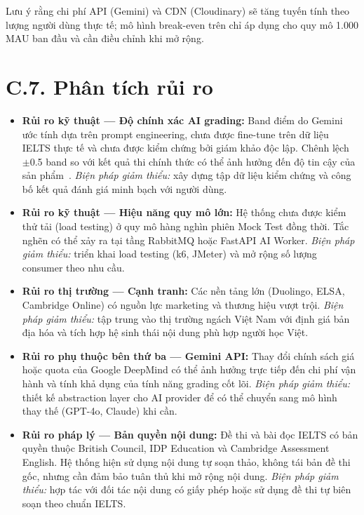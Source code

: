 Lưu ý rằng chi phí API (Gemini) và CDN (Cloudinary) sẽ tăng tuyến tính theo lượng người dùng thực tế; mô hình break-even trên chỉ áp dụng cho quy mô 1.000 MAU ban đầu và cần điều chỉnh khi mở rộng.

\section*{C.7. Phân tích rủi ro}

\begin{itemize}
    \item \textbf{Rủi ro kỹ thuật --- Độ chính xác AI grading:} Band điểm do Gemini ước tính dựa trên prompt engineering, chưa được fine-tune trên dữ liệu IELTS thực tế và chưa được kiểm chứng bởi giám khảo độc lập. Chênh lệch $\pm$0.5 band so với kết quả thi chính thức có thể ảnh hưởng đến độ tin cậy của sản phẩm~\cite{bachman1990fundamental}. \textit{Biện pháp giảm thiểu:} xây dựng tập dữ liệu kiểm chứng và công bố kết quả đánh giá minh bạch với người dùng.

    \item \textbf{Rủi ro kỹ thuật --- Hiệu năng quy mô lớn:} Hệ thống chưa được kiểm thử tải (load testing) ở quy mô hàng nghìn phiên Mock Test đồng thời. Tắc nghẽn có thể xảy ra tại tầng RabbitMQ hoặc FastAPI AI Worker. \textit{Biện pháp giảm thiểu:} triển khai load testing (k6, JMeter) và mở rộng số lượng consumer theo nhu cầu.

    \item \textbf{Rủi ro thị trường --- Cạnh tranh:} Các nền tảng lớn (Duolingo, ELSA, Cambridge Online) có nguồn lực marketing và thương hiệu vượt trội. \textit{Biện pháp giảm thiểu:} tập trung vào thị trường ngách Việt Nam với định giá bản địa hóa và tích hợp hệ sinh thái nội dung phù hợp người học Việt.

    \item \textbf{Rủi ro phụ thuộc bên thứ ba --- Gemini API:} Thay đổi chính sách giá hoặc quota của Google DeepMind có thể ảnh hưởng trực tiếp đến chi phí vận hành và tính khả dụng của tính năng grading cốt lõi. \textit{Biện pháp giảm thiểu:} thiết kế abstraction layer cho AI provider để có thể chuyển sang mô hình thay thế (GPT-4o, Claude) khi cần.

    \item \textbf{Rủi ro pháp lý --- Bản quyền nội dung:} Đề thi và bài đọc IELTS có bản quyền thuộc British Council, IDP Education và Cambridge Assessment English. Hệ thống hiện sử dụng nội dung tự soạn thảo, không tái bản đề thi gốc, nhưng cần đảm bảo tuân thủ khi mở rộng nội dung. \textit{Biện pháp giảm thiểu:} hợp tác với đối tác nội dung có giấy phép hoặc sử dụng đề thi tự biên soạn theo chuẩn IELTS.
\end{itemize}
